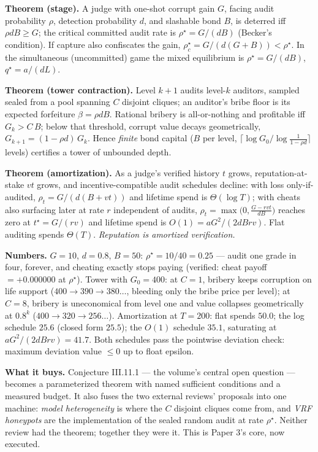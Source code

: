 \documentclass[11pt,a4paper]{article}
\begin{document}
\begin{thebox}
\textbf{Theorem (stage).} A judge with one-shot corrupt gain $G$, facing audit probability $\rho$, detection probability $d$, and slashable bond $B$, is deterred iff $\rho d B \ge G$; the critical committed audit rate is $\rho^\star = G/(dB)$ (Becker's condition). If capture also confiscates the gain, $\rho^\star_c = G/(d(G{+}B)) < \rho^\star$. In the simultaneous (uncommitted) game the mixed equilibrium is $\rho^\star = G/(dB)$, $q^\star = a/(dL)$.

\textbf{Theorem (tower contraction).} Level $k{+}1$ audits level-$k$ auditors, sampled sealed from a pool spanning $C$ disjoint cliques; an auditor's bribe floor is its expected forfeiture $\beta=\rho d B$. Rational bribery is all-or-nothing and profitable iff $G_k > C\,B$; below that threshold, corrupt value decays geometrically, $G_{k+1}=(1-\rho d)\,G_k$. Hence \emph{finite} bond capital ($B$ per level, $\lceil \log G_0 / \log \frac{1}{1-\rho d}\rceil$ levels) certifies a tower of unbounded depth.

\textbf{Theorem (amortization).} As a judge's verified history $t$ grows, reputation-at-stake $v t$ grows, and incentive-compatible audit schedules decline: with loss only-if-audited, $\rho_t = G/(d(B+vt))$ and lifetime spend is $\Theta(\log T)$; with cheats also surfacing later at rate $r$ independent of audits, $\rho_t = \max\!\big(0, \tfrac{G-rvt}{dB}\big)$ reaches zero at $t^\star = G/(rv)$ and lifetime spend is $O(1) = aG^2/(2dBrv)$. Flat auditing spends $\Theta(T)$. \emph{Reputation is amortized verification.}
\end{thebox}

\textbf{Numbers.} $G{=}10$, $d{=}0.8$, $B{=}50$: $\rho^\star = 10/40 = 0.25$ --- audit one grade in four, forever, and cheating exactly stops paying (verified: cheat payoff $=+0.000000$ at $\rho^\star$). Tower with $G_0{=}400$: at $C{=}1$, bribery keeps corruption on life support ($400\!\to\!390\!\to\!380\ldots$, bleeding only the bribe price per level); at $C{=}8$, bribery is uneconomical from level one and value collapses geometrically at $0.8^k$ ($400\!\to\!320\!\to\!256\ldots$). Amortization at $T{=}200$: flat spends $50.0$; the log schedule $25.6$ (closed form $25.5$); the $O(1)$ schedule $35.1$, saturating at $aG^2/(2dBrv)=41.7$. Both schedules pass the pointwise deviation check: maximum deviation value $\le 0$ up to float epsilon.



\textbf{What it buys.} Conjecture III.11.1 --- the volume's central open question --- becomes a parameterized theorem with named sufficient conditions and a measured budget. It also fuses the two external reviews' proposals into one machine: \emph{model heterogeneity} is where the $C$ disjoint cliques come from, and \emph{VRF honeypots} are the implementation of the sealed random audit at rate $\rho^\star$. Neither review had the theorem; together they were it. This is Paper 3's core, now executed.
\end{document}
